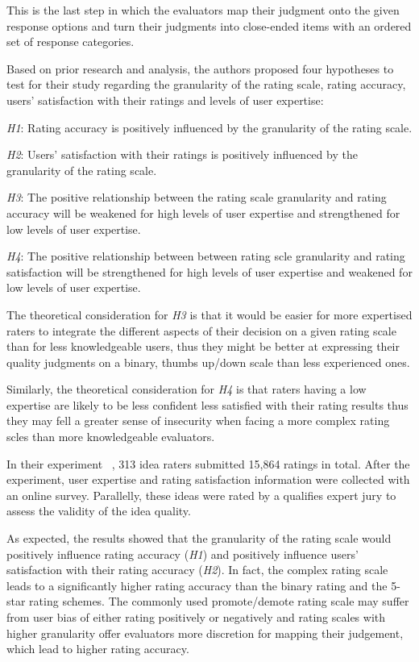 This is the last step in which the evaluators map their judgment onto the given
response options and turn their judgments into close-ended items with an ordered set of
response categories.

Based on prior research and analysis, the authors proposed four hypotheses to test for their study regarding the granularity of the rating scale, rating accuracy, users' satisfaction with their ratings and levels of user expertise:

\emph{H1}: Rating accuracy is positively influenced by the granularity of the rating scale.

\emph{H2}: Users' satisfaction with their ratings is positively influenced by the granularity of the rating scale.

\emph{H3}: The positive relationship between the rating scale granularity and rating accuracy will be weakened for high levels of user expertise and
strengthened for low levels of user expertise.

\emph{H4}: The positive relationship between between rating scle granularity and rating satisfaction will be strengthened for high levels of user expertise and
weakened for low levels of user expertise.

The theoretical consideration for \emph{H3} is that it would be easier for more expertised raters to integrate the different aspects of
their decision on a given rating scale than for less knowledgeable users, thus they might be better at expressing their quality judgments on a binary, thumbs up/down scale than less experienced ones.

Similarly, the theoretical consideration for \emph{H4} is that raters having a low expertise are likely to be less confident less satisfied with their rating results thus they may fell a greater sense of insecurity when facing a more complex rating scles than more knowledgeable evaluators.

In their experiment ~\cite{ratings}, 313 idea raters submitted 15,864 ratings in total. After the experiment, user expertise and rating satisfaction information were collected with an online survey. Parallelly, these ideas were rated by a qualifies expert jury to assess the validity of the idea quality.

As expected, the results showed that the granularity of the rating scale would positively influence rating
accuracy (\emph{H1}) and positively influence users’ satisfaction with their rating accuracy (\emph{H2}). In fact, the complex rating scale leads to a
significantly higher rating accuracy than the binary rating and the 5-star rating schemes. The commonly used promote/demote rating scale may suffer from user bias of either rating positively or negatively and rating scales with higher granularity offer evaluators more discretion for mapping their judgement, which lead to higher rating accuracy.

